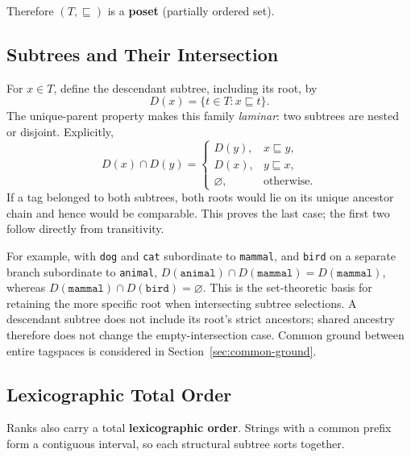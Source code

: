 \documentclass{article}
\begin{document}
Therefore $(T, \sqsubseteq)$ is a \textbf{poset} (partially ordered set).

\subsection{Subtrees and Their Intersection}

For $x\in T$, define the descendant subtree, including its root, by
\[
 D(x)=\{t\in T:x\sqsubseteq t\}.
\]
The unique-parent property makes this family \emph{laminar}: two subtrees
are nested or disjoint. Explicitly,
\[
D(x)\cap D(y)=
\begin{cases}
D(y),&x\sqsubseteq y,\\
D(x),&y\sqsubseteq x,\\
\varnothing,&\text{otherwise}.
\end{cases}
\]
If a tag belonged to both subtrees, both roots would lie on its unique
ancestor chain and hence would be comparable. This proves the last case;
the first two follow directly from transitivity.

For example, with \texttt{dog} and \texttt{cat} subordinate to \texttt{mammal},
and \texttt{bird} on a separate branch subordinate to \texttt{animal},
$D(\texttt{animal})\cap D(\texttt{mammal})=D(\texttt{mammal})$, whereas
$D(\texttt{mammal})\cap D(\texttt{bird})=\varnothing$.
This is the set-theoretic basis for retaining the more specific root when
intersecting subtree selections. A descendant subtree does not include its
root's strict ancestors; shared ancestry therefore does not change the
empty-intersection case. Common ground between entire tagspaces is
considered in Section~\ref{sec:common-ground}.

\begin{center}
\end{center}

\subsection{Lexicographic Total Order}

Ranks also carry a total \textbf{lexicographic order}. Strings with a common
prefix form a contiguous interval, so each structural subtree sorts together.
\end{document}
